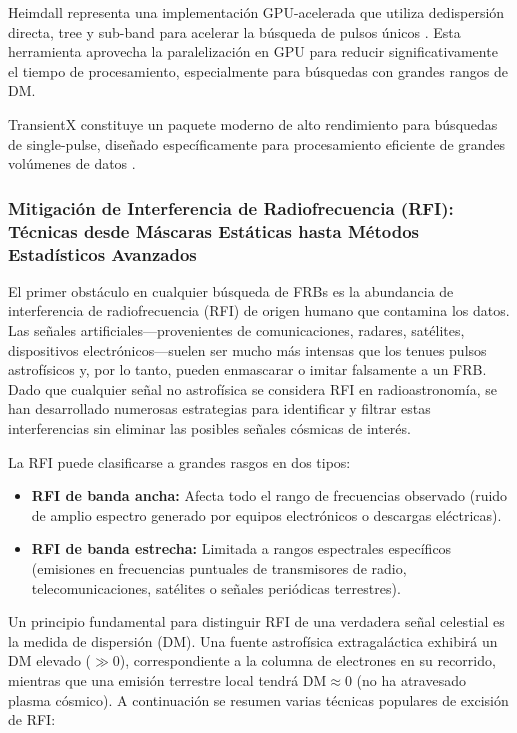 Heimdall representa una implementación GPU-acelerada que utiliza dedispersión directa, tree y sub-band para acelerar la búsqueda de pulsos únicos \citep{Barsdell_2012}. Esta herramienta aprovecha la paralelización en GPU para reducir significativamente el tiempo de procesamiento, especialmente para búsquedas con grandes rangos de DM.

TransientX constituye un paquete moderno de alto rendimiento para búsquedas de single-pulse, diseñado específicamente para procesamiento eficiente de grandes volúmenes de datos \citep{2024A&A...683A.183M}.

\subsubsection{Mitigación de Interferencia de Radiofrecuencia (RFI): Técnicas desde Máscaras Estáticas hasta Métodos Estadísticos Avanzados}

El primer obstáculo en cualquier búsqueda de FRBs es la abundancia de interferencia de radiofrecuencia (RFI) de origen humano que contamina los datos. Las señales artificiales—provenientes de comunicaciones, radares, satélites, dispositivos electrónicos—suelen ser mucho más intensas que los tenues pulsos astrofísicos y, por lo tanto, pueden enmascarar o imitar falsamente a un FRB. Dado que cualquier señal no astrofísica se considera RFI en radioastronomía, se han desarrollado numerosas estrategias para identificar y filtrar estas interferencias sin eliminar las posibles señales cósmicas de interés.

La RFI puede clasificarse a grandes rasgos en dos tipos:

\begin{itemize}
    \item \textbf{RFI de banda ancha:} Afecta todo el rango de frecuencias observado (ruido de amplio espectro generado por equipos electrónicos o descargas eléctricas).
    \item \textbf{RFI de banda estrecha:} Limitada a rangos espectrales específicos (emisiones en frecuencias puntuales de transmisores de radio, telecomunicaciones, satélites o señales periódicas terrestres).
\end{itemize}

Un principio fundamental para distinguir RFI de una verdadera señal celestial es la medida de dispersión (DM). Una fuente astrofísica extragaláctica exhibirá un DM elevado ($\gg$0), correspondiente a la columna de electrones en su recorrido, mientras que una emisión terrestre local tendrá DM$\approx$0 (no ha atravesado plasma cósmico). A continuación se resumen varias técnicas populares de excisión de RFI:

